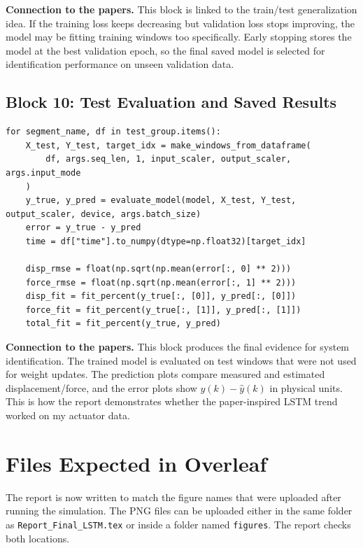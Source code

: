 \documentclass[11pt]{article}
\begin{document}
\noindent\textbf{Connection to the papers.}
This block is linked to the train/test generalization idea. If the training loss keeps decreasing but validation loss stops improving, the model may be fitting training windows too specifically. Early stopping stores the model at the best validation epoch, so the final saved model is selected for identification performance on unseen validation data.

\subsection{Block 10: Test Evaluation and Saved Results}
\begin{lstlisting}[style=pythonstyle]
for segment_name, df in test_group.items():
    X_test, Y_test, target_idx = make_windows_from_dataframe(
        df, args.seq_len, 1, input_scaler, output_scaler, args.input_mode
    )
    y_true, y_pred = evaluate_model(model, X_test, Y_test, output_scaler, device, args.batch_size)
    error = y_true - y_pred
    time = df["time"].to_numpy(dtype=np.float32)[target_idx]

    disp_rmse = float(np.sqrt(np.mean(error[:, 0] ** 2)))
    force_rmse = float(np.sqrt(np.mean(error[:, 1] ** 2)))
    disp_fit = fit_percent(y_true[:, [0]], y_pred[:, [0]])
    force_fit = fit_percent(y_true[:, [1]], y_pred[:, [1]])
    total_fit = fit_percent(y_true, y_pred)
\end{lstlisting}

\noindent\textbf{Connection to the papers.}
This block produces the final evidence for system identification. The trained model is evaluated on test windows that were not used for weight updates. The prediction plots compare measured and estimated displacement/force, and the error plots show $y(k)-\hat{y}(k)$ in physical units. This is how the report demonstrates whether the paper-inspired LSTM trend worked on my actuator data.


\section{Files Expected in Overleaf}
The report is now written to match the figure names that were uploaded after running the simulation. The PNG files can be uploaded either in the same folder as \texttt{Report\_Final\_LSTM.tex} or inside a folder named \texttt{figures}. The report checks both locations.
\end{document}
